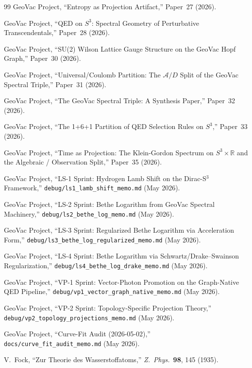\documentclass[11pt]{article}
\begin{document}
\begin{thebibliography}{99}
GeoVac Project, ``Entropy as Projection Artifact,'' Paper~27 (2026).

GeoVac Project, ``QED on $S^3$: Spectral Geometry of Perturbative
Transcendentals,'' Paper~28 (2026).

GeoVac Project, ``SU(2) Wilson Lattice Gauge Structure on the GeoVac
Hopf Graph,'' Paper~30 (2026).

GeoVac Project, ``Universal/Coulomb Partition: The $\mathcal{A}/D$
Split of the GeoVac Spectral Triple,'' Paper~31 (2026).

GeoVac Project, ``The GeoVac Spectral Triple: A Synthesis Paper,''
Paper~32 (2026).

GeoVac Project, ``The 1+6+1 Partition of QED Selection Rules
on $S^3$,'' Paper~33 (2026).

GeoVac Project, ``Time as Projection: The Klein-Gordon Spectrum on
$S^3 \times \mathbb{R}$ and the Algebraic / Observation Split,''
Paper~35 (2026).

GeoVac Project, ``LS-1 Sprint: Hydrogen Lamb Shift on the Dirac-S$^3$
Framework,'' \texttt{debug/ls1\_lamb\_shift\_memo.md} (May 2026).

GeoVac Project, ``LS-2 Sprint: Bethe Logarithm from GeoVac Spectral
Machinery,'' \texttt{debug/ls2\_bethe\_log\_memo.md} (May 2026).

GeoVac Project, ``LS-3 Sprint: Regularized Bethe Logarithm via
Acceleration Form,'' \texttt{debug/ls3\_bethe\_log\_regularized\_memo.md}
(May 2026).

GeoVac Project, ``LS-4 Sprint: Bethe Logarithm via Schwartz/Drake--Swainson
Regularization,'' \texttt{debug/ls4\_bethe\_log\_drake\_memo.md} (May 2026).

GeoVac Project, ``VP-1 Sprint: Vector-Photon Promotion on the
Graph-Native QED Pipeline,'' \texttt{debug/vp1\_vector\_graph\_native\_memo.md}
(May 2026).

GeoVac Project, ``VP-2 Sprint: Topology-Specific Projection Theory,''
\texttt{debug/vp2\_topology\_projections\_memo.md} (May 2026).

GeoVac Project, ``Curve-Fit Audit (2026-05-02),''
\texttt{docs/curve\_fit\_audit\_memo.md} (May 2026).

V.~Fock, ``Zur Theorie des Wasserstoffatoms,''
\textit{Z.\ Phys.}\ \textbf{98}, 145 (1935).


\end{thebibliography}
\end{document}
